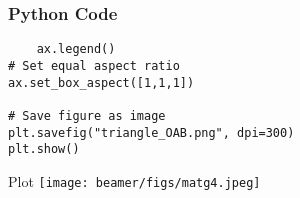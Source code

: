 \documentclass{beamer}
\begin{document}
\begin{frame}[fragile]
    \frametitle{Python Code}
    \begin{lstlisting}
    ax.legend()
# Set equal aspect ratio
ax.set_box_aspect([1,1,1])

# Save figure as image
plt.savefig("triangle_OAB.png", dpi=300)
plt.show()

    \end{lstlisting}
\end{frame}

\begin{frame}{Plot}
    \centering
    \texttt{[image: beamer/figs/matg4.jpeg]}     
\end{frame}
\end{document}
